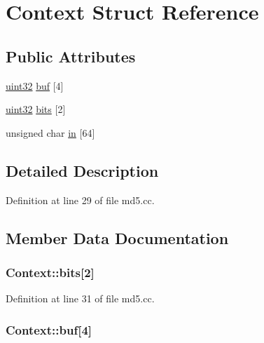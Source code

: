 \hypertarget{struct_context}{
\section{Context Struct Reference}
\label{struct_context}
}
\subsection*{Public Attributes}
\begin{DoxyCompactItemize}
\item 
\hyperlink{md5_8cc_acbd4acd0d29e2d6c43104827f77d9cd2}{uint32} \hyperlink{struct_context_a8065a4f6307f1c308177d840074317f0}{buf} \mbox{[}4\mbox{]}
\item 
\hyperlink{md5_8cc_acbd4acd0d29e2d6c43104827f77d9cd2}{uint32} \hyperlink{struct_context_a515c9568ac3a8a9cfa078e1517b0a330}{bits} \mbox{[}2\mbox{]}
\item 
unsigned char \hyperlink{struct_context_aa61c772c852c42003af44ec1c6bb56dc}{in} \mbox{[}64\mbox{]}
\end{DoxyCompactItemize}


\subsection{Detailed Description}


Definition at line 29 of file md5.cc.



\subsection{Member Data Documentation}
\hypertarget{struct_context_a515c9568ac3a8a9cfa078e1517b0a330}{
\subsubsection[{bits}]{ {\bf Context::bits}\mbox{[}2\mbox{]}}}
\label{struct_context_a515c9568ac3a8a9cfa078e1517b0a330}


Definition at line 31 of file md5.cc.

\hypertarget{struct_context_a8065a4f6307f1c308177d840074317f0}{
\subsubsection[{buf}]{ {\bf Context::buf}\mbox{[}4\mbox{]}}}
\label{struct_context_a8065a4f6307f1c308177d840074317f0}


